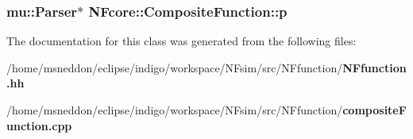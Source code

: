 \subsubsection{\setlength{\rightskip}{0pt plus 5cm}mu::Parser$\ast$ {\bf NFcore::CompositeFunction::p}\hspace{0.3cm}{\tt  [protected]}}\label{classNFcore_1_1CompositeFunction_21c7c20de56910c1b4299a050b7a399a}




The documentation for this class was generated from the following files:\begin{CompactItemize}
\item 
/home/msneddon/eclipse/indigo/workspace/NFsim/src/NFfunction/{\bf NFfunction.hh}\item 
/home/msneddon/eclipse/indigo/workspace/NFsim/src/NFfunction/{\bf compositeFunction.cpp}\end{CompactItemize}
